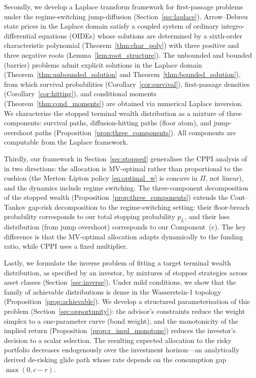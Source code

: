 \documentclass[11pt,a4paper]{article}
\numberwithin{equation}{section}
\begin{document}
Secondly, we develop a Laplace transform framework for first-passage problems under the regime-switching jump-diffusion (Section~\ref{sec:laplace}). Arrow--Debreu state prices in the Laplace domain satisfy a coupled system of ordinary integro-differential equations (OIDEs) whose solutions are determined by a sixth-order characteristic polynomial (Theorem~\ref{thm:char_poly}) with three positive and three negative roots (Lemma~\ref{lem:root_structure}). The unbounded and bounded (barrier) problems admit explicit solutions in the Laplace domain (Theorem~\ref{thm:unbounded_solution} and Theorem~\ref{thm:bounded_solution}), from which survival probabilities (Corollary~\ref{cor:survival}), first-passage densities (Corollary~\ref{cor:hitting}), and conditional moments (Theorem~\ref{thm:cond_moments}) are obtained via numerical Laplace inversion. We characterise the stopped terminal wealth distribution as a mixture of three components: survival paths, diffusion-hitting paths (floor atom), and jump-overshoot paths (Proposition~\ref{prop:three_components}). All components are computable from the Laplace framework.

Thirdly, our framework in Section~\ref{sec:stopped} generalises the CPPI analysis of \citet{ContTankov2009} in two directions: the allocation is MV-optimal rather than proportional to the cushion (the Merton--Lipton policy \eqref{eq:optimal_w} is concave in $\Pi$, not linear), and the dynamics include regime switching.  The three-component decomposition of the stopped wealth (Proposition~\ref{prop:three_components}) extends the Cont--Tankov gap-risk decomposition to the regime-switching setting: their floor-breach probability corresponds to our total stopping probability $p_L$, and their loss distribution (from jump overshoot) corresponds to our Component~(c).  The key difference is that the MV-optimal allocation adapts dynamically to the funding ratio, while CPPI uses a fixed multiplier.  

Lastly, we formulate the inverse problem of fitting a target terminal wealth distribution, as specified by an investor, by mixtures of stopped strategies across asset classes (Section~\ref{sec:inverse}). Under mild conditions, we show that the family of achievable distributions is dense in the Wasserstein-1 topology (Proposition~\ref{prop:achievable}).  We develop a structured parameterisation of this problem (Section~\ref{sec:opportunity}): the advisor's constraints reduce the weight simplex to a one-parameter curve (bond weight), and the monotonicity of the implied return (Proposition~\ref{prop:r_impl_monotone}) reduces the investor's decision to a scalar selection.  The resulting expected allocation to the risky portfolio decreases endogenously over the investment horizon---an analytically derived de-risking glide path whose rate depends on the consumption gap $\max(0, c - r)$.
\end{document}
